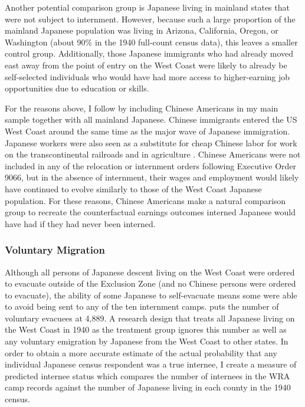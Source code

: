 \documentclass[12pt]{article}
\begin{document}
Another potential comparison group is Japanese living in mainland states
that were not subject to internment.
However, because such a large proportion of the mainland Japanese population
was living in Arizona, California, Oregon, or Washington
(about 90\% in the 1940 full-count census data),
this leaves a smaller control group.
Additionally, those Japanese immigrants who had already moved east away
from the point of entry on the West Coast
were likely to already be self-selected individuals
who would have had more access to higher-earning job opportunities
due to education or skills.

For the reasons above,
I follow \citet{arellano-boverDisplacementDiversityMobility2022}
by including Chinese Americans in my main sample
together with all mainland Japanese.
Chinese immigrants entered the US West Coast
around the same time as the major wave of Japanese immigration.
Japanese workers were also seen as a substitute for cheap Chinese labor
for work on the transcontinental railroads and in agriculture
\citep{chenImpactSkillBasedImmigration2015}.
Chinese Americans were not included in any of the relocation
or internment orders following Executive Order 9066,
but in the absence of internment,
their wages and employment would likely have continued to evolve similarly
to those of the West Coast Japanese population.
For these reasons, Chinese Americans make a natural comparison group
to recreate the counterfactual earnings outcomes interned Japanese
would have had if they had never been interned.
\subsubsection{Voluntary Migration}
\label{sec:orgb77fa42}
Although all persons of Japanese descent living on the West Coast
were ordered to evacuate outside of the Exclusion Zone
(and no Chinese persons were ordered to evacuate),
the ability of some Japanese to self-evacuate
means some were able to avoid being sent to any of the ten internment camps.
\citet{dewittjohnl.FinalReportJapanese1943} puts the number of
voluntary evacuees at 4,889.
A research design that treats all Japanese living on the West Coast in 1940
as the treatment group ignores this number
as well as any voluntary emigration by Japanese
from the West Coast to other states.
In order to obtain a more accurate estimate of the actual
probability that any individual Japanese census respondent was a true internee,
I create a measure of predicted internee status
which compares the number of internees in the WRA camp records
against the number of Japanese living in each county in the 1940 census.
\end{document}
